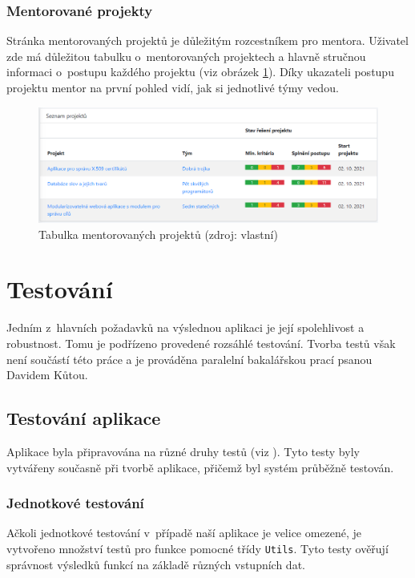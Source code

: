 \documentclass[czech,BP]{thesiskiv}
\begin{document}
	\subsection{Mentorované projekty}
	\par Stránka mentorovaných projektů je důležitým rozcestníkem pro mentora. Uživatel zde má důležitou tabulku o~mentorovaných projektech a hlavně stručnou informaci o~postupu každého projektu (viz obrázek \ref{fig:postup_projektu}). Díky ukazateli postupu projektu mentor na první pohled vidí, jak si jednotlivé týmy vedou.
	\begin{figure}[H]
		\centering
		\includegraphics[width=\textwidth]{img/ukazky/mentorovane_projekty}
		\caption{Tabulka mentorovaných projektů (zdroj: vlastní)}
		\label{fig:postup_projektu}
	\end{figure}
\chapter{Testování}
	\par Jedním z~hlavních požadavků na výslednou aplikaci je její spolehlivost a robustnost. Tomu je podřízeno provedené rozsáhlé testování. Tvorba testů však není součástí této práce a je prováděna paralelní bakalářskou prací  psanou Davidem Kůtou.
	\section{Testování aplikace}
	\par Aplikace byla připravována na různé druhy testů (viz ). Tyto testy byly vytvářeny současně při tvorbě aplikace, přičemž byl systém průběžně testován.
	\subsection{Jednotkové testování}
	\par Ačkoli jednotkové testování v~případě naší aplikace je velice omezené, je vytvořeno množství testů pro funkce pomocné třídy \texttt{Utils}. Tyto testy ověřují správnost výsledků funkcí na základě různých vstupních dat.
\end{document}
